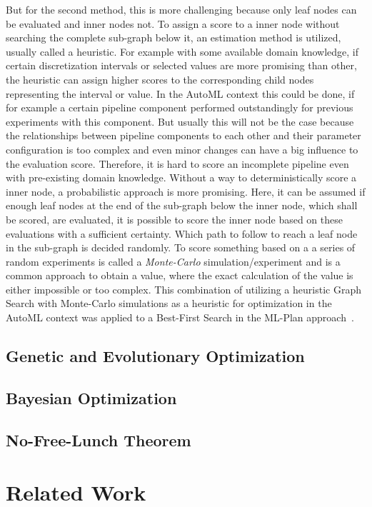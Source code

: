 But for the second method, this is more challenging because only leaf nodes can be evaluated and inner nodes not.
To assign a score to a inner node without searching the complete sub-graph below it, an estimation method is utilized, usually called a heuristic.\newline
For example with some available domain knowledge, if certain discretization intervals or selected values are more promising than other, the heuristic can assign higher scores to the corresponding child nodes representing the interval or value.
In the AutoML context this could be done, if for example a certain pipeline component performed outstandingly for previous experiments with this component.
But usually this will not be the case because the relationships between pipeline components to each other and their parameter configuration is too complex and even minor changes can have a big influence to the evaluation score.
Therefore, it is hard to score an incomplete pipeline even with pre-existing domain knowledge.\newline
Without a way to deterministically score a inner node, a probabilistic approach is more promising.
Here, it can be assumed if enough leaf nodes at the end of the sub-graph below the inner node, which shall be scored, are evaluated, it is possible to score the inner node based on these evaluations with a sufficient certainty.
Which path to follow to reach a leaf node in the sub-graph is decided randomly.
To score something based on a a series of random experiments is called a \textit{Monte-Carlo} simulation/experiment and is a common approach to obtain a value, where the exact calculation of the value is either impossible or too complex.
This combination of utilizing a heuristic Graph Search with Monte-Carlo simulations as a heuristic for optimization in the AutoML context was applied to a Best-First Search in the ML-Plan approach~\cite{Mohr-ML-Plan}. 

\subsection{Genetic and Evolutionary Optimization}
\label{sec:theory:optimization:genetic}

\Blindtext

\subsection{Bayesian Optimization}
\label{sec:theory:optimization:bayesian}

\Blindtext

\subsection{No-Free-Lunch Theorem}
\label{sec:theory:optimization:lunch}

\Blindtext

\section{Related Work}
\label{sec:theory:related}

\Blindtext
